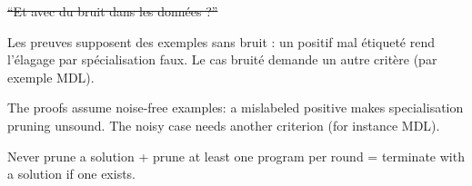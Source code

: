 \documentclass[10pt]{article}
\begin{document}
\st{``Et avec du bruit dans les données ?''}
\begin{dire}
Les preuves supposent des exemples sans bruit : un positif mal étiqueté rend l'élagage par spécialisation faux. Le cas bruité demande un autre critère (par exemple MDL).
\end{dire}
\begin{direEN}
The proofs assume noise-free examples: a mislabeled positive makes specialisation pruning unsound. The noisy case needs another criterion (for instance MDL).
\end{direEN}

\vspace{8pt}
\begin{tcolorbox}[colback=marine, colframe=marine, arc=0pt, boxrule=0pt,
  halign=center, top=4pt, bottom=4pt]
\color{white}\small Never prune a solution + prune at least one program per round = terminate with a solution if one exists.
\end{tcolorbox}
\end{document}
